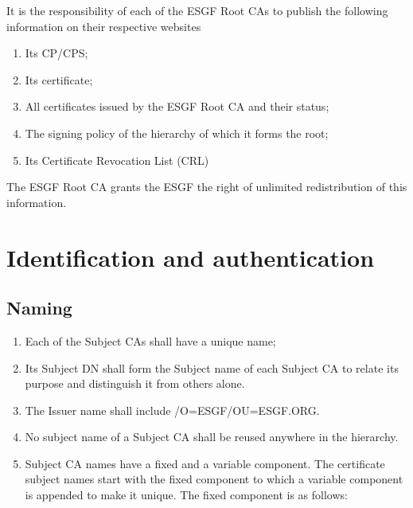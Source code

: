It is the responsibility of each of the ESGF Root CAs to publish the
following information on their respective websites

\begin{enumerate}
\item
  
  Its CP/CPS;
  
\item
  
  Its certificate;
  
\item
  
  All certificates issued by the ESGF Root CA and their status;
  
\item
  
  The signing policy of the hierarchy of which it forms the root;
  
\item
  
  Its Certificate Revocation List (CRL)
  
\end{enumerate}

The ESGF Root CA grants the ESGF the right of unlimited
redistribution of this information.

\section{Identification and authentication}\label{identification-and-authentication}

\subsection{Naming}\label{naming}

\begin{enumerate}
\item
  
  Each of the Subject CAs shall have a unique name;
  
\item
  
  Its Subject DN shall form the Subject name of each Subject CA to
  relate its purpose and distinguish it from others alone.
  
\item
  
  The Issuer name shall include /O=ESGF/OU=ESGF.ORG.
  
\item
  
  No subject name of a Subject CA shall be reused anywhere in the
  hierarchy.
  
\item
  
  Subject CA names have a fixed and a variable component. The
  certificate subject names start with the fixed component to which a
  variable component is appended to make it unique. The fixed component
  is as follows:
  
\end{enumerate}

